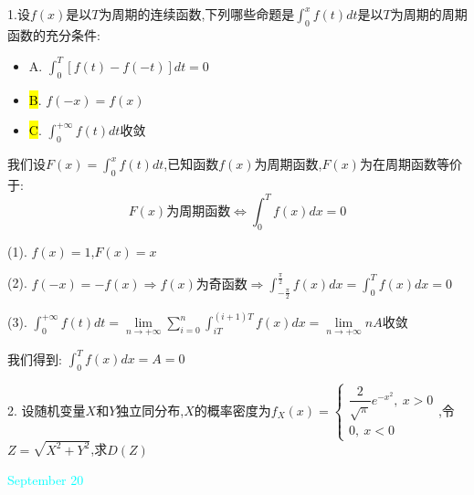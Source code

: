 1.设$f(x)$是以$T$为周期的连续函数,下列哪些命题是$\int_{0}^{x}f(t)dt$是以$T$为周期的周期函数的充分条件:  
\begin{itemize}
	\item A. $\int_{0}^{T}\left[ f(t)-f(-t)\right]dt=0$
	\item \hl{B}. $f(-x)=f(x)$
	\item \hl{C}. $\int_{0}^{+\infty}f(t)dt$收敛
\end{itemize}
\begin{solution}

	我们设$F(x)=\int_{0}^{x}f(t)dt$,已知函数$f(x)$为周期函数,$F(x)$为在周期函数等价于:  
	$$F(x)\text{为周期函数}\Leftrightarrow \int_{0}^{T}f(x)dx=0$$
	
	(1). $f(x)=1$,$F(x)=x$
	
	(2). $f(-x)=-f(x)\Rightarrow f(x)\text{为奇函数}\Rightarrow \int_{-\frac{\pi}{2}}^{\frac{\pi}{2}}f(x)dx=\int_{0}^{T}f(x)dx=0$
	
	(3). $\int_{0}^{+\infty}f(t)dt=\lim\limits_{n\to+\infty}\sum\limits_{i=0}^{n}\int_{iT}^{(i+1)T}f(x)dx=\lim\limits_{n\to+\infty}nA\text{收敛}$
	
	我们得到:  $\int_{0}^{T}f(x)dx=A=0$
\end{solution}

2. 设随机变量$X$和$Y$独立同分布,$X$的概率密度为$f_{X}(x)=\left\lbrace
\begin{array}{l}
	\dfrac{2}{\sqrt{\pi}}e^{-x^2},\ x>0\\
	0,\ x<0
\end{array}
\right. $,令$Z=\sqrt{X^2+Y^2}$,求$D(Z)$
\begin{solution}
	
\end{solution}

\textcolor{cyan}{September 20}

